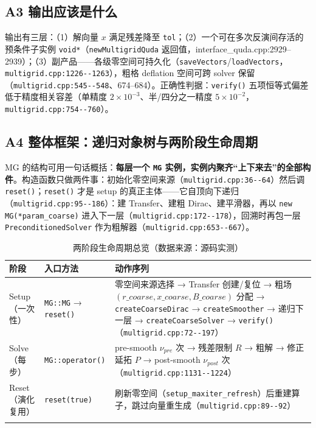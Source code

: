 \documentclass[UTF8]{ctexart}
\begin{document}
\subsection{A3 输出应该是什么}

输出有三层：（1）解向量 $x$ 满足残差降至 \texttt{tol}；（2）一个可在多次反演间存活的预条件子实例 \texttt{void*}（\texttt{newMultigridQuda} 返回值，interface\_quda.cpp:2929--2939）；（3）副产品——各级零空间可持久化（\texttt{saveVectors}/\texttt{loadVectors}，\textcolor{evidence}{\texttt{\nolinkurl{multigrid.cpp:1226--1263}}}），粗格 deflation 空间可跨 solver 保留（\textcolor{evidence}{\texttt{\nolinkurl{multigrid.cpp:545--548}}}、674--684）。正确性判据：\texttt{verify()} 五项恒等式偏差低于精度相关容差（单精度 $2\times10^{-3}$、半/四分之一精度 $5\times10^{-2}$，\textcolor{evidence}{\texttt{\nolinkurl{multigrid.cpp:754--760}}}）。

\subsection{A4 整体框架：递归对象树与两阶段生命周期}

MG 的结构可用一句话概括：\textbf{每层一个 \texttt{MG} 实例，实例内聚齐``上下来去''的全部构件}。构造函数只做两件事：初始化零空间来源（\textcolor{evidence}{\texttt{\nolinkurl{multigrid.cpp:36--64}}}）然后调 \texttt{reset()}；\texttt{reset()} 才是 setup 的真正主体——它自顶向下递归（\textcolor{evidence}{\texttt{\nolinkurl{multigrid.cpp:95--186}}}）：建 Transfer、建粗 Dirac、建平滑器，再以 \texttt{new MG(*param\_coarse)} 进入下一层（\textcolor{evidence}{\texttt{\nolinkurl{multigrid.cpp:172--178}}}），回溯时再包一层 \texttt{PreconditionedSolver} 作为粗解器（\textcolor{evidence}{\texttt{\nolinkurl{multigrid.cpp:653--667}}}）。

\begin{xltabular}{\textwidth}{llX}
\toprule
\textcolor{struct}{阶段} & 入口方法 & \textcolor{struct}{动作序列} \\
\midrule
\endhead
Setup（一次性） & \texttt{MG::MG} → \texttt{reset()} & 零空间来源选择 → Transfer 创建/复位 → 粗场 $(r\_coarse,x\_coarse,B\_coarse)$ 分配 → \texttt{createCoarseDirac} → \texttt{createSmoother} → 递归下一层 → \texttt{createCoarseSolver} → \texttt{verify()}（\textcolor{evidence}{\texttt{\nolinkurl{multigrid.cpp:72--197}}}） \\
Solve（每步） & \texttt{MG::operator()} & pre-smooth $\nu_{pre}$ 次 → 残差限制 $R$ → 粗解 → 修正延拓 $P$ → post-smooth $\nu_{post}$ 次（\textcolor{evidence}{\texttt{\nolinkurl{multigrid.cpp:1131--1224}}}） \\
Reset（演化复用） & \texttt{reset(true)} & 刷新零空间（\texttt{setup\_maxiter\_refresh}）后重建算子，跳过向量重生成（\textcolor{evidence}{\texttt{\nolinkurl{multigrid.cpp:89--92}}}） \\
\bottomrule
\caption{两阶段生命周期总览（数据来源：源码实测）}
\end{xltabular}
\end{document}
